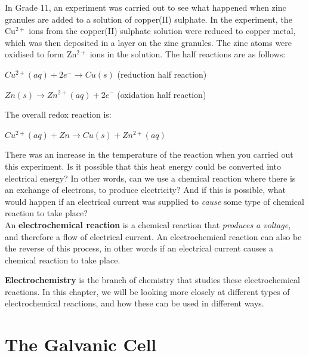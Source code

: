 In Grade 11, an experiment was carried out to see what happened when zinc granules are added to a solution of copper(II) sulphate. In the experiment, the Cu$^{2+}$ ions from the copper(II) sulphate solution were reduced to copper metal, which was then deposited in a layer on the zinc granules. The zinc atoms were oxidised to form Zn$^{2+}$ ions in the solution. The half reactions are as follows: 

\begin{center}
\rm${Cu^{2+}(aq) + 2e^{-} \rightarrow Cu(s)}$ (reduction half reaction)

\rm${Zn(s) \rightarrow Zn^{2+}(aq) + 2e^{-}}$ (oxidation half reaction)
\end{center}

The overall redox reaction is:
\begin{center}
\rm${Cu^{2+}(aq) + Zn \rightarrow Cu(s) + Zn^{2+}(aq)}$
\end{center}

There was an increase in the temperature of the reaction when you carried out this experiment. Is it possible that this heat energy could be converted into electrical energy? In other words, can we use a chemical reaction where there is an exchange of electrons, to produce electricity? And if this is possible, what would happen if an electrical current was supplied to \textit{cause} some type of chemical reaction to take place?\\

An \textbf{electrochemical reaction} is a chemical reaction that \textit{produces a voltage}, and therefore a flow of electrical current. An electrochemical reaction can also be the reverse of this process, in other words if an electrical current causes a chemical reaction to take place.


\textbf{Electrochemistry} is the branch of chemistry that studies these electrochemical reactions. In this chapter, we will be looking more closely at different types of electrochemical reactions, and how these can be used in different ways.







\section{The Galvanic Cell}
\label{sec:electrochemical:galvanic}

